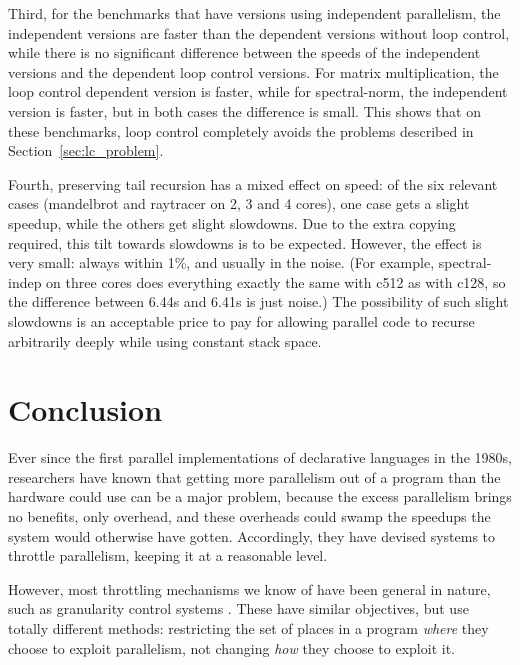 Third, for the benchmarks that have versions using independent parallelism,
the independent versions are faster than
the dependent versions without loop control,
while there is no significant difference between
the speeds of the independent versions and the dependent loop control versions.
For matrix multiplication, the loop control dependent version is faster,
while for spectral-norm, the independent version is faster,
but in both cases the difference is small.
This shows that on these benchmarks, loop control completely avoids
the problems described in Section~\ref{sec:lc_problem}.

Fourth, preserving tail recursion has a mixed effect on speed:
of the six relevant cases (mandelbrot and raytracer on 2, 3 and 4 cores),
one case gets a slight speedup, while the others get slight slowdowns.
Due to the extra copying required,
this tilt towards slowdowns is to be expected.
However, the effect is very small:
always within 1\%, and usually in the noise.
(For example, spectral-indep on three cores
does everything exactly the same with c512 as with c128,
so the difference between 6.44s and 6.41s is just noise.)
The possibility of such slight slowdowns is an acceptable price to pay
for allowing parallel code to recurse arbitrarily deeply
while using constant stack space.

\section{Conclusion}
\label{sec:lc_conc}


Ever since the first parallel implementations
of declarative languages in the 1980s,
researchers have known that getting more parallelism out of a program
than the hardware could use can be a major problem,
because the excess parallelism brings no benefits, only overhead,
and these overheads could swamp
the speedups the system would otherwise have gotten.
Accordingly, they have devised systems to throttle parallelism,
keeping it at a reasonable level.

However, most throttling mechanisms we know of
have been general in nature,
such as granularity control systems \citep{lopez96:distance_granularity}.
These have similar objectives,
but use totally different methods:
restricting the set of places in a program
\emph{where} they choose to exploit parallelism,
not changing \emph{how} they choose to exploit it.

